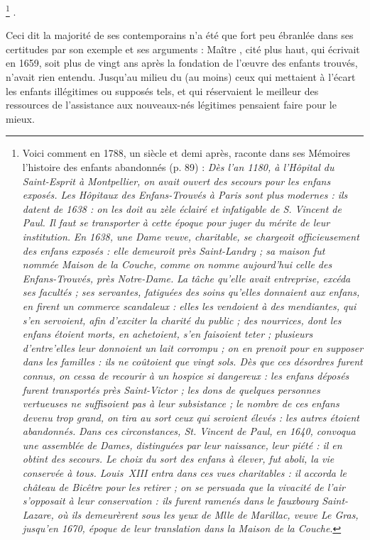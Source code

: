 \footnote{Voici comment en 1788, un siècle et demi après,  raconte dans ses Mémoires l'histoire des enfants abandonnés (p. 89) : \emph{Dès l'an 1180, à l'Hôpital du Saint-Esprit à Montpellier, on avait ouvert des secours pour les enfans exposés. Les Hôpitaux des Enfans-Trouvés à Paris sont plus modernes : ils datent de 1638 : on les doit au zèle éclairé et infatigable de S. Vincent de Paul. Il faut se transporter à cette époque pour juger du mérite de leur institution.}
\emph{ En 1638, une Dame veuve, charitable, se chargeoit officieusement des enfans exposés : elle demeuroit près Saint-Landry ; sa maison fut nommée Maison de la Couche, comme on nomme aujourd'hui celle des Enfans-Trouvés, près Notre-Dame.}
\emph{La tâche qu'elle avait entreprise, excéda ses facultés ; ses servantes, fatiguées des soins qu'elles donnaient aux enfans, en firent un commerce scandaleux : elles les vendoient à des mendiantes, qui s'en servoient, afin d'exciter la charité du public ; des nourrices, dont les enfans étoient morts, en achetoient, s'en faisoient teter ; plusieurs d'entre'elles leur donnoient un lait corrompu ; on en prenoit pour en supposer dans les familles : ils ne coûtoient que vingt sols. Dès que ces désordres furent connus, on cessa de recourir à un hospice si dangereux : les enfans déposés furent transportés près Saint-Victor ; les dons de quelques personnes vertueuses ne suffisoient pas à leur subsistance ; le nombre de ces enfans devenu trop grand, on tira au sort ceux qui seroient élevés : les autres étoient abandonnés.}
\emph{Dans ces circonstances, St. Vincent de Paul, en 1640, convoqua une assemblée de Dames, distinguées par leur naissance, leur piété : il en obtint des secours. Le choix du sort des enfans à élever, fut aboli, la vie conservée à tous. Louis~XIII entra dans ces vues charitables : il accorda le château de Bicêtre pour les retirer ; on se persuada que la vivacité de l'air s'opposait à leur conservation : ils furent ramenés dans le fauxbourg Saint-Lazare, où ils demeurèrent sous les yeux de Mlle de Marillac, veuve Le Gras, jusqu'en 1670, époque de leur translation dans la Maison de la Couche}.}%
.

 Ceci dit la majorité de ses contemporains n'a été que fort peu ébranlée dans ses certitudes par son exemple et ses arguments : Maître , cité plus haut, qui écrivait en 1659, soit plus de vingt ans après la fondation de l'œuvre des enfants trouvés, n'avait rien entendu. Jusqu'au milieu du  (au moins) ceux qui mettaient à l'écart les enfants illégitimes ou supposés tels, et qui réservaient le meilleur des ressources de l'assistance aux nouveaux-nés légitimes pensaient faire pour le mieux. 


